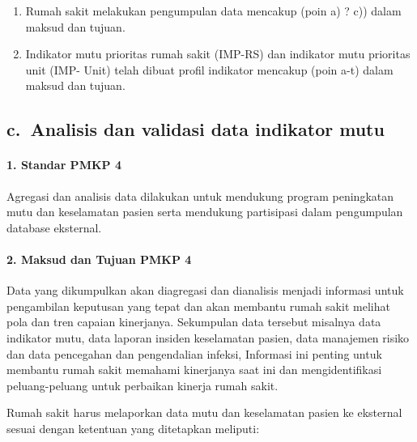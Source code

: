 \documentclass[
]{book}
\providecommand{\tightlist}{%
  \setlength{\itemsep}{0pt}\setlength{\parskip}{0pt}}
\begin{document}
\begin{enumerate}
\def\labelenumi{\alph{enumi}.}
\tightlist
\item
  Rumah sakit melakukan pengumpulan data mencakup (poin a) ? c)) dalam maksud dan tujuan.
\item
  Indikator mutu prioritas rumah sakit (IMP-RS) dan indikator mutu prioritas unit (IMP- Unit) telah dibuat profil indikator mencakup (poin a-t) dalam maksud dan tujuan.
\end{enumerate}

\hypertarget{c.-analisis-dan-validasi-data-indikator-mutu}{%
\subsection*{c.~Analisis dan validasi data indikator mutu}\label{c.-analisis-dan-validasi-data-indikator-mutu}}

\hypertarget{standar-pmkp-4}{%
\paragraph*{1. Standar PMKP 4}\label{standar-pmkp-4}}

Agregasi dan analisis data dilakukan untuk mendukung program peningkatan mutu dan keselamatan pasien serta mendukung partisipasi dalam pengumpulan database eksternal.

\hypertarget{maksud-dan-tujuan-pmkp-4}{%
\paragraph*{2. Maksud dan Tujuan PMKP 4}\label{maksud-dan-tujuan-pmkp-4}}

Data yang dikumpulkan akan diagregasi dan dianalisis menjadi informasi untuk pengambilan keputusan yang tepat dan akan membantu rumah sakit melihat pola dan tren capaian kinerjanya. Sekumpulan data tersebut misalnya data indikator mutu, data laporan insiden keselamatan pasien, data manajemen risiko dan data pencegahan dan pengendalian infeksi, Informasi ini penting untuk membantu rumah sakit memahami kinerjanya saat ini dan mengidentifikasi peluang-peluang untuk perbaikan kinerja rumah sakit.

Rumah sakit harus melaporkan data mutu dan keselamatan pasien ke eksternal sesuai dengan ketentuan yang ditetapkan meliputi:
\end{document}
